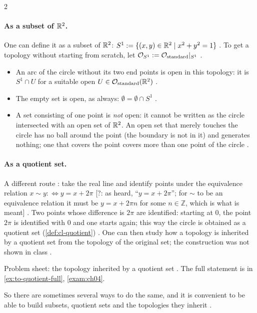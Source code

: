 \begin{paracol}{2}
\paragraph{As a subset of $\mathbb{R}^2$.} One can define it as a subset of $\mathbb{R}^2$:
$S^1:=\{(x,y)\in\mathbb{R}^2\mid x^2+y^2=1\}$ . To get a topology without starting from scratch, let
$\mathcal O_{S^1}:=\mathcal O_{\rm standard}|_{S^1}$ .
\begin{itemize}
  \item An arc of the circle without its two end points is open in this topology: it is $S^1\cap U$ for a suitable open
        $U\in\mathcal O_{\rm standard}(\mathbb{R}^2)$ .
  \item The empty set is open, as always: $\emptyset=\emptyset\cap S^1$ .
  \item A set consisting of one point is \emph{not} open: it cannot be written as the circle intersected with an open set of
        $\mathbb{R}^2$. An open set that merely touches the circle has no ball around the point (the boundary is not in it) and
        generates nothing; one that covers the point covers more than one point of the circle
        .
\end{itemize}

\paragraph{As a quotient set.} A different route : take the real line and identify points under
the equivalence relation $x\sim y:\Leftrightarrow y=x+2\pi$ [?: as heard, ``$y=x+2\pi$''; for $\sim$ to be an equivalence
relation it must be $y=x+2\pi n$ for some $n\in\mathbb Z$, which is what is meant] . Two points whose
difference is $2\pi$ are identified: starting at $0$, the point $2\pi$ is identified with $0$ and one starts again; this way
the circle is obtained as a quotient set (\cref{def:cl-quotient}) . One can then study how a topology
is inherited by a quotient set from the topology of the original set; the construction was not shown in class
.
\begin{exercise}\label{ex:to-quotient}
Problem sheet: the topology inherited by a quotient set . The full statement is in
\cref{ex:to-quotient-full}, \cref{exam:ch04}.
\end{exercise}
So there are sometimes several ways to do the same, and it is convenient to be able to build subsets, quotient sets and the
topologies they inherit .


\end{paracol}
